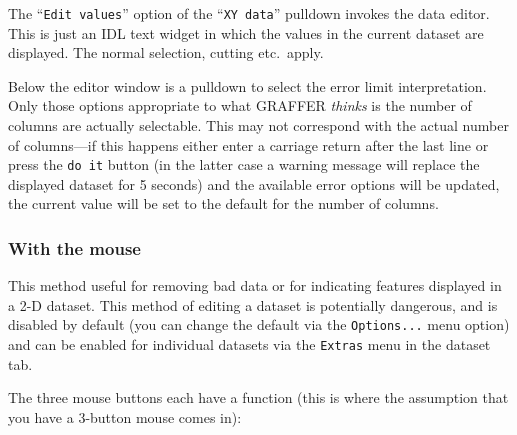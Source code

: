 \documentclass[11pt,twoside,english]{article}
\begin{document}
The {}``\texttt{Edit values}'' option of the {}``\texttt{XY data}''
pulldown invokes the data editor. This is just an IDL text widget in
which the values in the current dataset are displayed. The normal
selection, cutting etc.\ apply.

Below the editor window is a pulldown to select the error limit
interpretation.  Only those options appropriate to what GRAFFER
\textit{thinks} is the number of columns are actually selectable. This
may not correspond with the actual number of columns---if this happens
either enter a carriage return after the last line or press the
\texttt{do it} button (in the latter case a warning message will
replace the displayed dataset for 5 seconds) and the available error
options will be updated, the current value will be set to the default
for the number of columns.


\subsubsection{With the mouse}

This method
useful for removing bad data or for indicating features displayed in a
2-D dataset. This method of editing a dataset is potentially dangerous,
and is disabled by default (you can change the default via the
\texttt{Options...} menu option) and can be enabled for individual
datasets via the \texttt{Extras} menu in the dataset tab.

The three mouse buttons each have a function (this is where the
assumption that you have a 3-button mouse comes in):
\end{document}
